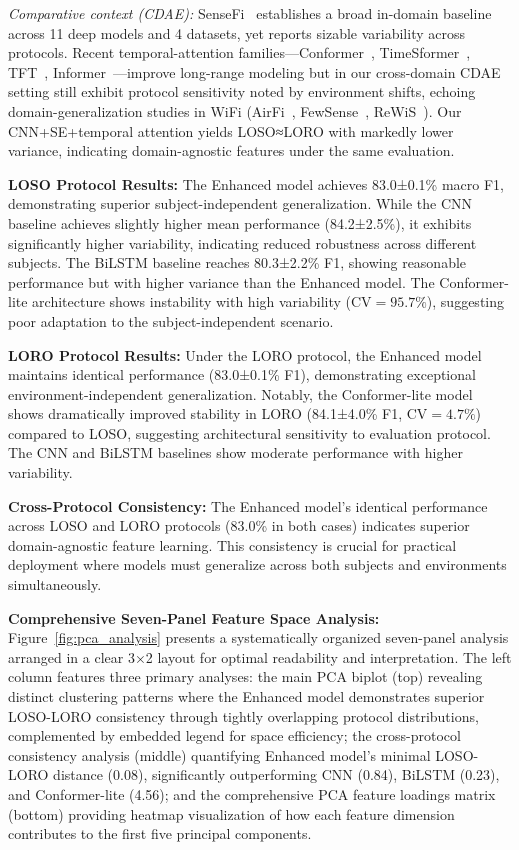 \documentclass[journal]{IEEEtran}
\begin{document}
\noindent\textit{Comparative context (CDAE):} SenseFi~\cite{yang2023sensefi} establishes a broad in-domain baseline across 11 deep models and 4 datasets, yet reports sizable variability across protocols. Recent temporal-attention families—Conformer~\cite{gulati2020conformer}, TimeSformer~\cite{bertasius2021timesformer}, TFT~\cite{lim2021tft}, Informer~\cite{zhou2021informer}—improve long-range modeling but in our cross-domain CDAE setting still exhibit protocol sensitivity noted by environment shifts, echoing domain-generalization studies in WiFi (AirFi~\cite{airfi2022}, FewSense~\cite{fewsense2022}, ReWiS~\cite{rewis2022}). Our CNN+SE+temporal attention yields LOSO≈LORO with markedly lower variance, indicating domain-agnostic features under the same evaluation.

\textbf{LOSO Protocol Results:} The Enhanced model achieves 83.0±0.1\% macro F1, demonstrating superior subject-independent generalization. While the CNN baseline achieves slightly higher mean performance (84.2±2.5\%), it exhibits significantly higher variability, indicating reduced robustness across different subjects. The BiLSTM baseline reaches 80.3±2.2\% F1, showing reasonable performance but with higher variance than the Enhanced model. The Conformer-lite architecture shows instability with high variability ($\text{CV}=95.7\%$), suggesting poor adaptation to the subject-independent scenario.

\textbf{LORO Protocol Results:} Under the LORO protocol, the Enhanced model maintains identical performance (83.0±0.1\% F1), demonstrating exceptional environment-independent generalization. Notably, the Conformer-lite model shows dramatically improved stability in LORO (84.1±4.0\% F1, $\text{CV}=4.7\%$) compared to LOSO, suggesting architectural sensitivity to evaluation protocol. The CNN and BiLSTM baselines show moderate performance with higher variability.

\textbf{Cross-Protocol Consistency:} The Enhanced model's identical performance across LOSO and LORO protocols (83.0\% in both cases) indicates superior domain-agnostic feature learning. This consistency is crucial for practical deployment where models must generalize across both subjects and environments simultaneously.

\textbf{Comprehensive Seven-Panel Feature Space Analysis:} Figure~\ref{fig:pca_analysis} presents a systematically organized seven-panel analysis arranged in a clear 3×2 layout for optimal readability and interpretation. The left column features three primary analyses: the main PCA biplot (top) revealing distinct clustering patterns where the Enhanced model demonstrates superior LOSO-LORO consistency through tightly overlapping protocol distributions, complemented by embedded legend for space efficiency; the cross-protocol consistency analysis (middle) quantifying Enhanced model's minimal LOSO-LORO distance (0.08), significantly outperforming CNN (0.84), BiLSTM (0.23), and Conformer-lite (4.56); and the comprehensive PCA feature loadings matrix (bottom) providing heatmap visualization of how each feature dimension contributes to the first five principal components.
\end{document}
